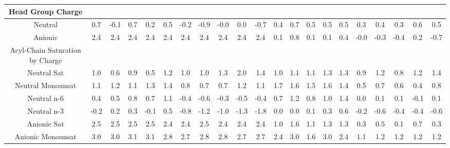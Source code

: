 \documentclass[preprint,3p,9pt,times,onecolumn]{elsarticle}
\begin{document}
\begin{table}
{\begin{tabular}{| c || cccccccccccccccccccc |}
\hline\hline
Head Group Charge &&&&&&&&&&&&&&&&&&&&\\ \hline
Neutral & 0.7        & -0.1       & 0.7        & 0.2        & 0.5        & -0.2       & -0.9       & -0.0       & 0.0        & -0.7       & 0.4        & 0.7        & 0.5        & 0.5        & 0.5        & 0.3        & 0.4        & 0.3        & 0.6        & 0.5        \\
Anionic & 2.4        & 2.4        & 2.4        & 2.4        & 2.4        & 2.4        & 2.4        & 2.4        & 2.4        & 2.4        & 0.1        & 0.8        & 0.1        & 0.1        & 0.4        & -0.0       & -0.3       & -0.4       & 0.2        & -0.7      \\
\hline
\hline
Acyl-Chain Saturation by Charge &&&&&&&&&&&&&&&&&&&&\\ \hline
Neutral Sat    & 1.0        & 0.6        & 0.9        & 0.5        & 1.2        & 1.0        & 1.0        & 1.3        & 2.0        & 1.4        & 1.0        & 1.1        & 1.1        & 1.3        & 1.3        & 0.9        & 1.2        & 0.8        & 1.2        & 1.4        \\
Neutral Monounsat    & 1.1        & 1.2        & 1.1        & 1.3        & 1.4        & 0.8        & 0.7        & 0.7        & 1.2        & 1.1        & 1.7        & 1.6        & 1.5        & 1.6        & 1.4        & 0.5        & 0.7        & 0.6        & 0.4        & 0.8        \\
Neutral n-6    & 0.4        & 0.5        & 0.8        & 0.7        & 1.1        & -0.4       & -0.6       & -0.3       & -0.5       & -0.4       & 0.7        & 1.2        & 0.8        & 1.0        & 1.4        & 0.0        & 0.1        & 0.1        & -0.1       & 0.1        \\
Neutral n-3    & -0.2       & 0.2        & 0.3        & -0.1       & 0.5        & -0.8       & -1.2       & -1.0       & -1.3       & -1.8       & 0.0        & 0.0        & 0.1        & 0.3        & 0.6        & -0.2       & -0.6       & -0.4       & -0.4       & -0.6       \\
\hline
Anionic Sat     & 2.5        & 2.5        & 2.5        & 2.5        & 2.4        & 2.4        & 2.5        & 2.4        & 2.4        & 2.4        & 1.0        & 1.6        & 1.1        & 1.3        & 1.3        & 0.3        & 0.5        & 0.1        & 0.7        & 0.3        \\
Anionic Monounsat    & 3.0        & 3.0        & 3.1        & 3.1        & 2.8        & 2.7        & 2.8        & 2.8        & 2.7        & 2.7        & 2.4        & 3.0        & 1.6        & 3.0        & 2.4        & 1.1        & 1.2        & 1.2        & 1.2        & 1.2        \\

\end{tabular}}
\end{table}
\end{document}

